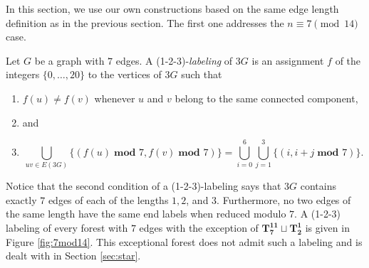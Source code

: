 In this section, we use our own constructions based on the same edge length definition as in the previous section. The first one addresses the $n \equiv 7 \pmod{14}$ case.

\begin{definition}\label{def:1-2-3}
    Let $G$ be a graph with $7$ edges. A (1-2-3)-\emph{labeling} of $3G$ is an assignment $f$ of the integers $\{0,\dots,20\}$ to the vertices of $3G$ such that
    \begin{enumerate}
        \item $f(u) \neq f(v)$ whenever $u$ and $v$ belong to the same connected component, 
        \item[] and
        \item $$ \bigcup_{uv\in E(3G)} \{(f(u)\; \textbf{mod } 7,f(v)\; \textbf{mod } 7)\}= \bigcup_{i=0}^{6} \bigcup_{j=1}^{3} \{(i,i+j \; \textbf{mod } 7)\}.$$
    \end{enumerate}
\end{definition}
Notice that the second condition of a (1-2-3)-labeling says that $3G$ contains exactly $7$ edges of each of the lengths $1,2$, and $3$. Furthermore, no two edges of the same length have the same end labels when reduced modulo $7.$ A (1-2-3) labeling of every forest with $7$ edges with the exception of $\mathbf{T_{7}^{11}}\sqcup\mathbf{T_{2}^{1}}$ is given in Figure \ref{fig:7mod14}. This exceptional forest does not admit such a labeling and is dealt with in Section \ref{sec:star}.

